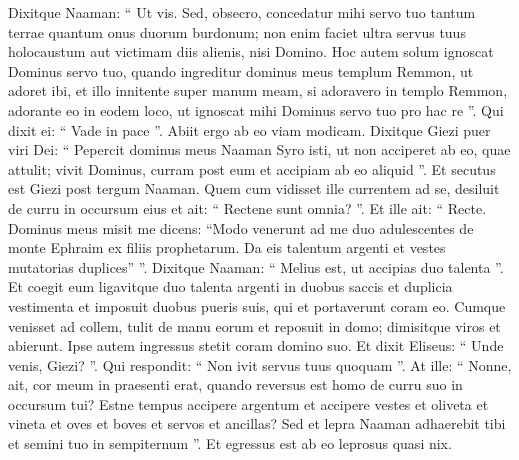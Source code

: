 \begin{biblechapter}
\begin{biblechapter}
\begin{biblechapter}
\begin{biblechapter}
\begin{biblechapter}
\verse Dixitque Naaman: “ Ut vis. Sed, obsecro, concedatur mihi servo tuo tantum terrae quantum onus duorum burdonum; non enim faciet ultra servus tuus holocaustum aut victimam diis alienis, nisi Domino. 
 \verse Hoc autem solum ignoscat Dominus servo tuo, quando ingreditur dominus meus templum Remmon, ut adoret ibi, et illo innitente super manum meam, si adoravero in templo Remmon, adorante eo in eodem loco, ut ignoscat mihi Dominus servo tuo pro hac re ”. 
\verse Qui dixit ei: “ Vade in pace ”. Abiit ergo ab eo viam modicam.
 \verse Dixitque Giezi puer viri Dei: “ Pepercit dominus meus Naaman Syro isti, ut non acciperet ab eo, quae attulit; vivit Dominus, curram post eum et accipiam ab eo aliquid ”. 
\verse Et secutus est Giezi post tergum Naaman. Quem cum vidisset ille currentem ad se, desiluit de curru in occursum eius et ait: “ Rectene sunt omnia? ”. 
\verse Et ille ait: “ Recte. Dominus meus misit me dicens: “Modo venerunt ad me duo adulescentes de monte Ephraim ex filiis prophetarum. Da eis talentum argenti et vestes mutatorias duplices” ”. 
\verse Dixitque Naaman: “ Melius est, ut accipias duo talenta ”. Et coegit eum ligavitque duo talenta argenti in duobus saccis et duplicia vestimenta et imposuit duobus pueris suis, qui et portaverunt coram eo. 
\verse Cumque venisset ad collem, tulit de manu eorum et reposuit in domo; dimisitque viros et abierunt. 
\verse Ipse autem ingressus stetit coram domino suo. Et dixit Eliseus: “ Unde venis, Giezi? ”. Qui respondit: “ Non ivit servus tuus quoquam ”. 
\verse At ille: “ Nonne, ait, cor meum in praesenti erat, quando reversus est homo de curru suo in occursum tui? Estne tempus accipere argentum et accipere vestes et oliveta et vineta et oves et boves et servos et ancillas? 
\verse Sed et lepra Naaman adhaerebit tibi et semini tuo in sempiternum ”. Et egressus est ab eo leprosus quasi nix.
 

\end{biblechapter}
\end{biblechapter}
\end{biblechapter}
\end{biblechapter}
\end{biblechapter}
